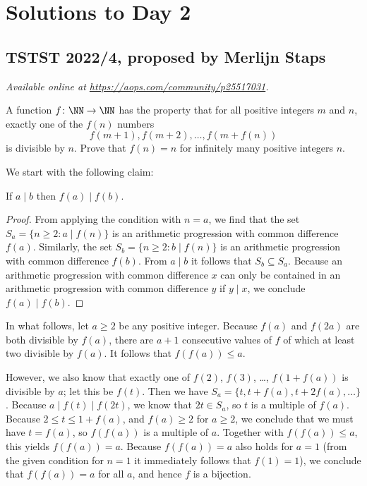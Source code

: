 \documentclass[11pt]{scrartcl}
\begin{document}
\section{Solutions to Day 2}
\subsection{TSTST 2022/4, proposed by Merlijn Staps}
\textsl{Available online at \url{https://aops.com/community/p25517031}.}
\begin{mdframed}[style=mdpurplebox,frametitle={Problem statement}]
A function $f \colon \NN \to \NN$ has the property that
for all positive integers $m$ and $n$, exactly one of the $f(n)$ numbers
\[ f(m+1), f(m+2), \dots, f(m+f(n)) \]
is divisible by $n$.
Prove that $f(n)=n$ for infinitely many positive integers $n$.
\end{mdframed}
We start with the following claim:

\begin{claim*}
  If $a \mid b$ then $f(a) \mid f(b)$.
\end{claim*}
\begin{proof}
  From applying the condition with $n=a$,
  we find that the set $S_a = \{n \ge 2: a \mid f(n)\}$
  is an arithmetic progression with common difference $f(a)$.
  Similarly, the set $S_b = \{n \ge 2: b \mid f(n)\}$
  is an arithmetic progression with common difference $f(b)$.
  From $a \mid b$ it follows that $S_b \subseteq S_a$.
  Because an arithmetic progression with common difference $x$ can only be
  contained in an arithmetic progression with common difference $y$
  if $y \mid x$, we conclude $f(a) \mid f(b)$.
\end{proof}

In what follows, let $a \ge 2$ be any positive integer.
Because $f(a)$ and $f(2a)$ are both divisible by $f(a)$,
there are $a+1$ consecutive values of $f$ of which
at least two divisible by $f(a)$. It follows that $f(f(a)) \le a$.

However, we also know that exactly one of
$f(2)$, $f(3)$, \dots, $f(1+f(a))$ is divisible by $a$; let this be $f(t)$.
Then we have $S_a = \{t, t+f(a), t+2f(a), \dots\}$.
Because $a \mid f(t) \mid f(2t)$,
we know that $2t \in S_a$, so $t$ is a multiple of $f(a)$.
Because $2 \le t \le 1+f(a)$, and $f(a) \ge 2$ for $a \ge 2$,
we conclude that we must have $t=f(a)$,
so $f(f(a))$ is a multiple of $a$.
Together with $f(f(a)) \le a$, this yields $f(f(a)) = a$.
Because $f(f(a)) = a$ also holds for $a=1$
(from the given condition for $n=1$ it immediately follows that $f(1)=1$),
we conclude that $f(f(a))=a$ for all $a$, and hence $f$ is a bijection.
\end{document}
